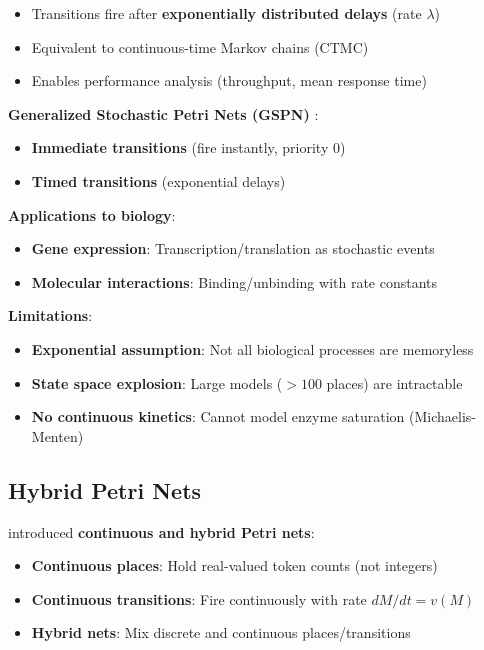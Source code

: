 \begin{itemize}
    \item Transitions fire after \textbf{exponentially distributed delays} (rate $\lambda$)
    \item Equivalent to continuous-time Markov chains (CTMC)
    \item Enables performance analysis (throughput, mean response time)
\end{itemize}

\textbf{Generalized Stochastic Petri Nets (GSPN)} \citep{Ajmone1984}:

\begin{itemize}
    \item \textbf{Immediate transitions} (fire instantly, priority 0)
    \item \textbf{Timed transitions} (exponential delays)
\end{itemize}

\textbf{Applications to biology}:

\begin{itemize}
    \item \textbf{Gene expression}: Transcription/translation as stochastic events
    \item \textbf{Molecular interactions}: Binding/unbinding with rate constants
\end{itemize}

\textbf{Limitations}:

\begin{itemize}
    \item \textbf{Exponential assumption}: Not all biological processes are memoryless
    \item \textbf{State space explosion}: Large models ($>100$ places) are intractable
    \item \textbf{No continuous kinetics}: Cannot model enzyme saturation (Michaelis-Menten)
\end{itemize}

\subsection{Hybrid Petri Nets}
\label{subsec:hybrid-pn}

\citet{David1992} introduced \textbf{continuous and hybrid Petri nets}:

\begin{itemize}
    \item \textbf{Continuous places}: Hold real-valued token counts (not integers)
    \item \textbf{Continuous transitions}: Fire continuously with rate $dM/dt = v(M)$
    \item \textbf{Hybrid nets}: Mix discrete and continuous places/transitions
\end{itemize}

